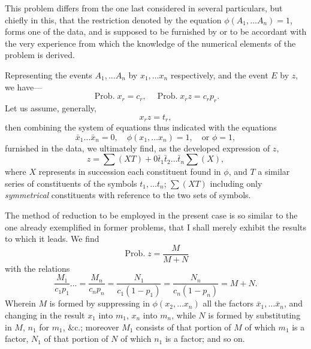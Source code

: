 \documentclass[oneside]{book}
\begin{document}
This problem differs from the one last considered in several
particulars, but chiefly in this, that the restriction denoted by the
equation $\phi(A_1, \dotsc A_n)=1$, forms one of the data, and is supposed
to be furnished by or to be accordant with the very experience
from which the knowledge of the numerical elements of the
problem is derived.

Representing the events $A_1,\dotsc A_n$ by $x_1,\dotsc x_n$ respectively,
and the event $E$ by $z$, we have---
\begin{equation}\tag{1}
\operatorname{Prob. } x_r=c_r, \quad
 \operatorname{Prob. } x_r z = c_r p_r.
\end{equation}
Let us assume, generally,
\begin{equation*}
x_r z = t_r,
\end{equation*}
then combining the system of equations thus indicated with the
equations
\begin{equation*}
\bar{x}_1 \dotsc \bar{x}_n = 0, \quad \phi(x_1, \dotsc x_n)=1, \quad \text{or } \phi=1,
\end{equation*}
furnished in the data, we ultimately find, as the developed
expression of $z$,
\begin{equation}\tag{2}
z= {\textstyle \sum}(XT) + 0 \bar{t}_1 \bar{t}_2 \dotsc
 \bar{t}_n {\textstyle \sum}(X),
\end{equation}
where $X$ represents in succession each constituent found in $\phi$,
and $T$ a similar series of constituents of the symbols
$t_1,\dotsc t_n$;
$\sum(XT)$ including only \emph{symmetrical} constituents with reference
to the two sets of symbols.

The method of reduction to be employed in the present case
is so similar to the one already exemplified in former problems,
that I shall merely exhibit the results to which it leads. We
find
\begin{equation}\tag{3}
\operatorname{Prob. } z = \frac{M}{M+N}
\end{equation}
with the relations
\begin{equation}\tag{4}
\frac{M_1}{c_1 p_1}\dotso = \frac{M_n}{c_n p_n}
=\frac{N_1}{c_1 (1-p_1)}=\frac{N_n}{c_n(1-p_n)}=M+N.
\end{equation}
Wherein $M$ is formed by suppressing in $\phi(x_2,\dotsc x_n)$ all the
factors $\bar{x}_1, \dotsc \bar{x}_n$, and changing in the result $x_1$ into $m_1$, $x_n$ into $m_n$,
while $N$ is formed by substituting in $M$, $n_1$ for $m_1$, \&c.; moreover
$M_1$ consists of that portion of $M$ of which $m_1$ is a factor,
$N_1$ of that portion of $N$ of which $n_1$ is a factor; and so on.
\end{document}
